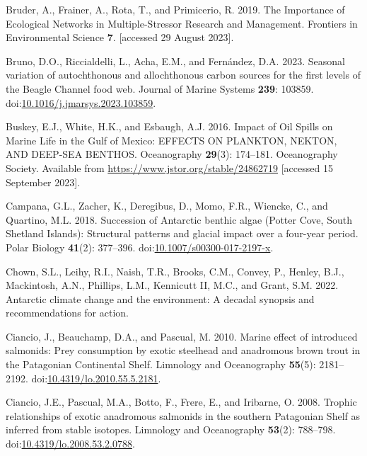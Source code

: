 \documentclass[
]{article}
\newlength{\cslhangindent}
\newenvironment{CSLReferences}[2] %
 {\begin{list}{}{%
  \setlength{\itemindent}{0pt}
  \setlength{\leftmargin}{0pt}
  \setlength{\parsep}{0pt}
  \ifodd #1
   \setlength{\leftmargin}{\cslhangindent}
   \setlength{\itemindent}{-1\cslhangindent}
  \fi
  \setlength{\itemsep}{#2\baselineskip}}}
 {\end{list}}
\begin{document}
\begin{CSLReferences}{1}{0}
Bruder, A., Frainer, A., Rota, T., and Primicerio, R. 2019. The
{Importance} of {Ecological Networks} in {Multiple-Stressor Research}
and {Management}. Frontiers in Environmental Science \textbf{7}.
{[}accessed 29 August 2023{]}.

Bruno, D.O., Riccialdelli, L., Acha, E.M., and Fernández, D.A. 2023.
Seasonal variation of autochthonous and allochthonous carbon sources for
the first levels of the {Beagle Channel} food web. Journal of Marine
Systems \textbf{239}: 103859.
doi:\href{https://doi.org/10.1016/j.jmarsys.2023.103859}{10.1016/j.jmarsys.2023.103859}.

Buskey, E.J., White, H.K., and Esbaugh, A.J. 2016. Impact of {Oil
Spills} on {Marine Life} in the {Gulf} of {Mexico}: {EFFECTS ON
PLANKTON}, {NEKTON}, {AND DEEP-SEA BENTHOS}. Oceanography
\textbf{29}(3): 174--181. Oceanography Society. Available from
\url{https://www.jstor.org/stable/24862719} {[}accessed 15 September
2023{]}.

Campana, G.L., Zacher, K., Deregibus, D., Momo, F.R., Wiencke, C., and
Quartino, M.L. 2018. Succession of {Antarctic} benthic algae ({Potter
Cove}, {South Shetland Islands}): Structural patterns and glacial impact
over a four-year period. Polar Biology \textbf{41}(2): 377--396.
doi:\href{https://doi.org/10.1007/s00300-017-2197-x}{10.1007/s00300-017-2197-x}.

Chown, S.L., Leihy, R.I., Naish, T.R., Brooks, C.M., Convey, P., Henley,
B.J., Mackintosh, A.N., Phillips, L.M., Kennicutt II, M.C., and Grant,
S.M. 2022. Antarctic climate change and the environment: A decadal
synopsis and recommendations for action.

Ciancio, J., Beauchamp, D.A., and Pascual, M. 2010. Marine effect of
introduced salmonids: {Prey} consumption by exotic steelhead and
anadromous brown trout in the {Patagonian Continental Shelf}. Limnology
and Oceanography \textbf{55}(5): 2181--2192.
doi:\href{https://doi.org/10.4319/lo.2010.55.5.2181}{10.4319/lo.2010.55.5.2181}.

Ciancio, J.E., Pascual, M.A., Botto, F., Frere, E., and Iribarne, O.
2008. Trophic relationships of exotic anadromous salmonids in the
southern {Patagonian Shelf} as inferred from stable isotopes. Limnology
and Oceanography \textbf{53}(2): 788--798.
doi:\href{https://doi.org/10.4319/lo.2008.53.2.0788}{10.4319/lo.2008.53.2.0788}.


\end{CSLReferences}
\end{document}
